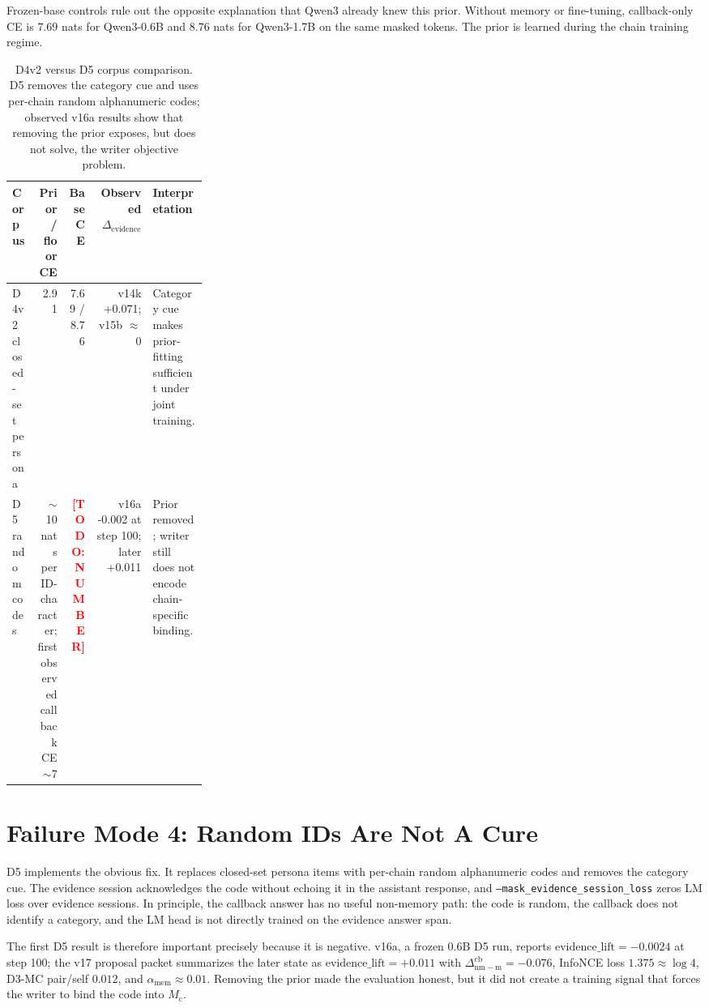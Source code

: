 \documentclass{article}
\newcommand{\todo}[1]{\textcolor{red}{\textbf{[TODO: #1]}}}
\newcommand{\Mc}{M_{\mathrm{c}}}
\newcommand{\dnm}{\Delta_{\mathrm{nm-m}}}
\newcommand{\elift}{\Delta_{\mathrm{evidence}}}
\newcommand{\amem}{\alpha_{\mathrm{mem}}}
\begin{document}
Frozen-base controls rule out the opposite explanation that Qwen3
already knew this prior.  Without memory or fine-tuning, callback-only
CE is $7.69$ nats for Qwen3-0.6B and $8.76$ nats for Qwen3-1.7B on the
same masked tokens.  The prior is learned during the chain training
regime.

\begin{table}[t]
\centering
\caption{D4v2 versus D5 corpus comparison.  D5 removes the category cue
and uses per-chain random alphanumeric codes; observed v16a results
show that removing the prior exposes, but does not solve, the writer
objective problem.}
\label{tab:corpus_compare}
\small
\begin{tabular}{lrrrp{0.28\linewidth}}
\toprule
Corpus & Prior / floor CE & Base CE & Observed $\elift$ & Interpretation \\
\midrule
D4v2 closed-set persona & 2.91 & 7.69 / 8.76 & v14k +0.071; v15b $\approx$0 & Category cue makes prior-fitting sufficient under joint training. \\
D5 random codes & $\sim$10 nats per ID-character; first observed callback CE $\sim$7 & \todo{NUMBER} & v16a -0.002 at step 100; later +0.011 & Prior removed; writer still does not encode chain-specific binding. \\
\bottomrule
\end{tabular}
\end{table}

\section{Failure Mode 4: Random IDs Are Not A Cure}

D5 implements the obvious fix.  It replaces closed-set persona items
with per-chain random alphanumeric codes and removes the category cue.
The evidence session acknowledges the code without echoing it in the
assistant response, and \texttt{--mask\_evidence\_session\_loss} zeros
LM loss over evidence sessions.  In principle, the callback answer has
no useful non-memory path: the code is random, the callback does not
identify a category, and the LM head is not directly trained on the
evidence answer span.

The first D5 result is therefore important precisely because it is
negative.  v16a, a frozen 0.6B D5 run, reports
$\mathrm{evidence\_lift}=-0.0024$ at step 100; the v17 proposal packet
summarizes the later state as $\mathrm{evidence\_lift}=+0.011$ with
$\dnm^{\mathrm{cb}}=-0.076$, InfoNCE loss $1.375 \approx \log 4$, D3-MC
pair/self $0.012$, and $\amem \approx 0.01$.  Removing the prior made
the evaluation honest, but it did not create a training signal that
forces the writer to bind the code into $\Mc$.
\end{document}

